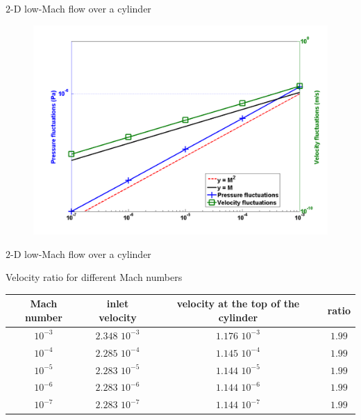 \documentclass[xcolor=dvipsnames,10pt]{beamer}
\begin{document}
\begin{frame}{$2$-D low-Mach flow over a cylinder}
\begin{figure}[H]
\centering
\includegraphics[width=\textwidth]{../figures/pressure_fluctuation.png}
\end{figure}
\end{frame}
\begin{frame}{$2$-D low-Mach flow over a cylinder}
\begin{center}
Velocity ratio for different Mach numbers
\end{center}
\begin{table}[H]
\begin{center}
\begin{tabular}{|c|c|c|c|}
\hline
Mach number & inlet velocity & velocity at the top of the cylinder & ratio \\ \hline
$10^{-3}$ & $2.348$ $10^{-3}$ & $1.176$ $10^{-3}$& $1.99$  \\ \hline
$10^{-4}$ & $2.285$ $10^{-4}$ & $1.145$ $10^{-4}$& $1.99$  \\ \hline
$10^{-5}$ & $2.283$ $10^{-5}$ & $1.144$ $10^{-5}$ & $1.99$ \\ \hline
$10^{-6}$ & $2.283$ $10^{-6}$ & $1.144$ $10^{-6}$ & $1.99$ \\ \hline
$10^{-7}$ & $2.283$ $10^{-7}$ & $1.144$ $10^{-7}$ & $1.99$ \\ \hline
\end{tabular}
\end{center}
\nonumber
\end{table}
\end{frame}
\end{document}

